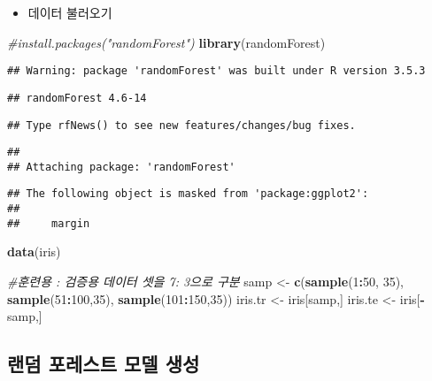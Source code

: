 \documentclass[]{article}
\newenvironment{Shaded}{\begin{snugshade}}{\end{snugshade}}
\newcommand{\KeywordTok}[1]{\textcolor[rgb]{0.13,0.29,0.53}{\textbf{#1}}}
\newcommand{\DecValTok}[1]{\textcolor[rgb]{0.00,0.00,0.81}{#1}}
\newcommand{\StringTok}[1]{\textcolor[rgb]{0.31,0.60,0.02}{#1}}
\newcommand{\CommentTok}[1]{\textcolor[rgb]{0.56,0.35,0.01}{\textit{#1}}}
\newcommand{\OperatorTok}[1]{\textcolor[rgb]{0.81,0.36,0.00}{\textbf{#1}}}
\newcommand{\NormalTok}[1]{#1}
\providecommand{\tightlist}{%
  \setlength{\itemsep}{0pt}\setlength{\parskip}{0pt}}
\begin{document}
\begin{itemize}
\tightlist
\item
  데이터 불러오기
\end{itemize}

\begin{Shaded}
\begin{Highlighting}[]
\CommentTok{#install.packages("randomForest")}
\KeywordTok{library}\NormalTok{(randomForest)}
\end{Highlighting}
\end{Shaded}

\begin{verbatim}
## Warning: package 'randomForest' was built under R version 3.5.3
\end{verbatim}

\begin{verbatim}
## randomForest 4.6-14
\end{verbatim}

\begin{verbatim}
## Type rfNews() to see new features/changes/bug fixes.
\end{verbatim}

\begin{verbatim}
## 
## Attaching package: 'randomForest'
\end{verbatim}

\begin{verbatim}
## The following object is masked from 'package:ggplot2':
## 
##     margin
\end{verbatim}

\begin{Shaded}
\begin{Highlighting}[]
\KeywordTok{data}\NormalTok{(iris)}

\CommentTok{#훈련용 : 검증용 데이터 셋을 7: 3으로 구분}
\NormalTok{samp <-}\StringTok{ }\KeywordTok{c}\NormalTok{(}\KeywordTok{sample}\NormalTok{(}\DecValTok{1}\OperatorTok{:}\DecValTok{50}\NormalTok{, }\DecValTok{35}\NormalTok{), }\KeywordTok{sample}\NormalTok{(}\DecValTok{51}\OperatorTok{:}\DecValTok{100}\NormalTok{,}\DecValTok{35}\NormalTok{), }\KeywordTok{sample}\NormalTok{(}\DecValTok{101}\OperatorTok{:}\DecValTok{150}\NormalTok{,}\DecValTok{35}\NormalTok{))}
\NormalTok{iris.tr <-}\StringTok{ }\NormalTok{iris[samp,]}
\NormalTok{iris.te <-}\StringTok{ }\NormalTok{iris[}\OperatorTok{-}\NormalTok{samp,]}
\end{Highlighting}
\end{Shaded}

\subsection{랜덤 포레스트 모델 생성}\label{---}
\end{document}
